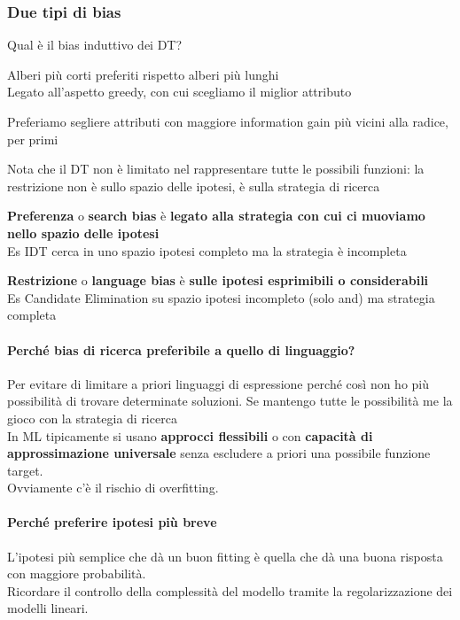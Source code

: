 \documentclass[10pt]{book}
\begin{document}
\subsubsection{Due tipi di bias}
Qual è il bias induttivo dei DT?
\begin{list}{}{}
	\item Alberi più corti preferiti rispetto alberi più lunghi\\
	Legato all'aspetto greedy, con cui scegliamo il miglior attributo
	\item Preferiamo segliere attributi con maggiore information gain più vicini alla radice, per primi
\end{list}
Nota che il DT non è limitato nel rappresentare tutte le possibili funzioni: la restrizione non è sullo spazio delle ipotesi, è sulla strategia di ricerca
\begin{list}{}{}
	\item \textbf{Preferenza} o \textbf{search bias} è \textbf{legato alla strategia con cui ci muoviamo nello spazio delle ipotesi}\\
	Es IDT cerca in uno spazio ipotesi completo ma la strategia è incompleta
	\item \textbf{Restrizione} o \textbf{language bias} è \textbf{sulle ipotesi esprimibili o considerabili}\\
	Es Candidate Elimination su spazio ipotesi incompleto (solo and) ma strategia completa
\end{list}
\paragraph{Perché bias di ricerca preferibile a quello di linguaggio?} Per evitare di limitare a priori linguaggi di espressione perché così non ho più possibilità di trovare determinate soluzioni. Se mantengo tutte le possibilità me la gioco con la strategia di ricerca\\
In ML tipicamente si usano \textbf{approcci flessibili} o con \textbf{capacità di approssimazione universale} senza escludere a priori una possibile funzione target.\\Ovviamente c'è il rischio di overfitting.
\paragraph{Perché preferire ipotesi più breve} L'ipotesi più semplice che dà un buon fitting è quella che dà una buona risposta con maggiore probabilità.\\
Ricordare il controllo della complessità del modello tramite la regolarizzazione dei modelli lineari.
\end{document}
